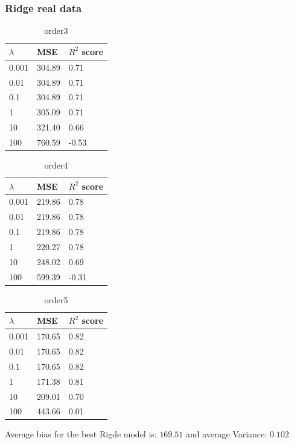 \documentclass [11pt]{article}
\begin{document}
\subsubsection{Ridge real data}
\begin{table}[H]
\centering
\begin{tabular}{lll}
\hline
$\lambda$ & MSE    & $R^{2}$ score \\ \hline
0.001     & 304.89 & 0.71          \\
0.01      & 304.89 & 0.71          \\
0.1       & 304.89 & 0.71         \\
1         & 305.09 & 0.71         \\
10        & 321.40 & 0.66          \\
100       & 760.59 & -0.53          \\ \hline
\end{tabular}
\caption{order3}
\label{tab:ridge3Terrain}
\end{table}

\begin{table}[H]
\centering
\begin{tabular}{lll}
\hline
$\lambda$ & MSE    & $R^{2}$ score \\ \hline
0.001     & 219.86 & 0.78          \\
0.01      & 219.86 & 0.78          \\
0.1       & 219.86 & 0.78         \\
1         & 220.27 & 0.78          \\
10        & 248.02 & 0.69          \\
100       & 599.39 & -0.31          \\ \hline
\end{tabular}
\caption{order4}
\label{tab:ridge4Terrain}
\end{table}

\begin{table}[H]
\centering
\begin{tabular}{lll}
\hline
$\lambda$ & MSE    & $R^{2}$ score \\ \hline
0.001     & 170.65 & 0.82          \\
0.01      & 170.65 & 0.82          \\
0.1       & 170.65 & 0.82         \\
1         & 171.38 & 0.81          \\
10        & 209.01 & 0.70          \\
100       & 443.66 & 0.01          \\ \hline
\end{tabular}
\caption{order5}
\label{tab:ridge5Terrain}
\end{table}
Average bias for the best Rigde model is: $169.51$ and average Variance: $0.102$
\end{document}
